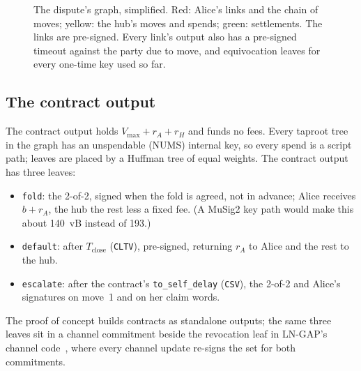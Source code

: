 \documentclass[11pt]{article}
\newcommand{\vmax}{V_{\max}}
\newcommand{\Tc}{T_{\mathrm{close}}}
\newcommand{\tx}[1]{\texttt{#1}}
\begin{document}
\begin{figure}[!htp]
\caption{The dispute's graph, simplified. Red: Alice's links and the
chain of moves; yellow: the hub's moves and spends; green: settlements.
The links are pre-signed. Every link's output also has a pre-signed
timeout against the party due to move, and equivocation leaves for every
one-time key used so far.}
\label{fig:graph}
\end{figure}

\subsection{The contract output}
\label{sec:output}

The contract output holds $\vmax + r_A + r_H$ and funds no fees. Every
taproot tree in the graph has an unspendable (NUMS) internal key, so
every spend is a script path; leaves are placed by a Huffman tree of
equal weights. The contract output has three leaves:
\begin{itemize}[leftmargin=1.5em]
\item \tx{fold}: the 2-of-2, signed when the fold is agreed, not in
  advance; Alice receives $b + r_A$, the hub the rest less a fixed fee.
  (A MuSig2 key path would make this about 140~vB instead of 193.)
\item \tx{default}: after $\Tc$ (\texttt{CLTV}), pre-signed, returning
  $r_A$ to Alice and the rest to the hub.
\item \tx{escalate}: after the contract's \texttt{to\_self\_delay}
  (\texttt{CSV}), the 2-of-2 and Alice's signatures on move~1 and on
  her claim words.
\end{itemize}
The proof of concept builds contracts as standalone outputs; the same
three leaves sit in a channel commitment beside the revocation leaf
in LN-GAP's channel code~\cite{lngapcode}, where every channel update
re-signs the set for both commitments.
\end{document}
